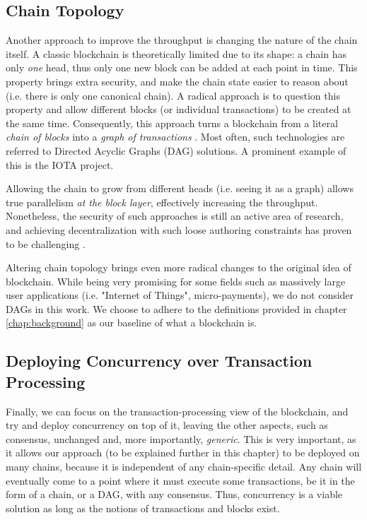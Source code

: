 \subsection{Chain Topology}

Another approach to improve the throughput is changing the nature of the chain itself. A classic
blockchain is theoretically limited due to its shape: a chain has only \textit{one} head, thus only
one new block can be added at each point in time. This property brings extra security, and make the
chain state easier to reason about (i.e. there is only one canonical chain). A radical approach is
to question this property and allow different blocks (or individual transactions) to be created at
the same time. Consequently, this approach turns a blockchain from a literal \textit{chain of
blocks} into a \textit{graph of transactions} \cite{pervezComparativeAnalysisDAGBased2018}. Most
often, such technologies are referred to Directed Acyclic Graphs (DAG) solutions. A prominent
example of this is the IOTA project\cite{mIOTANextGenerationBlock2018}.

Allowing the chain to grow from different heads (i.e. seeing it as a graph) allows true parallelism
\textit{at the block layer}, effectively increasing the throughput. Nonetheless, the security of
such approaches is still an active area of research, and achieving decentralization with such loose
authoring constraints has proven to be challenging \cite{sompolinskySPECTREFastScalable2016}.

Altering chain topology brings even more radical changes to the original idea of blockchain.
While being very promising for some fields such as massively large user applications (i.e. "Internet
of Things", micro-payments), we do not consider DAGs in this work. We choose to adhere to the
definitions provided in chapter \ref{chap:background} as our baseline of what a blockchain is.

\subsection{Deploying Concurrency over Transaction Processing}
\label{chap_approach:subsec:out_of_box_concurrency}

Finally, we can focus on the transaction-processing view of the blockchain, and try and deploy
concurrency on top of it, leaving the other aspects, such as consensus, unchanged and, more
importantly, \textit{generic}. This is very important, as it allows our approach (to be explained
further in this chapter) to be deployed on many chains, because it is independent of any
chain-specific detail. Any chain will eventually come to a point where it must execute some
transactions, be it in the form of a chain, or a DAG, with any consensus. Thus, concurrency is a
viable solution as long as the notions of transactions and blocks exist.


